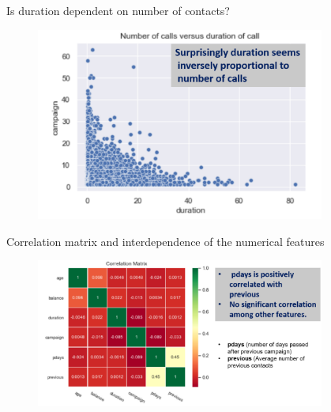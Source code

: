 \begin{frame}{Is duration dependent on number of contacts?}


	\begin{figure}
		
		\includegraphics[width=9.50cm]{figures/fig_duration_contact_scatter.png}
	\end{figure}


\end{frame}


\begin{frame}{Correlation matrix and interdependence of the numerical features}


	\begin{figure}
		
		\includegraphics[width=9.50cm]{figures/fig_corr_matrix.png}
	\end{figure}

\end{frame}




